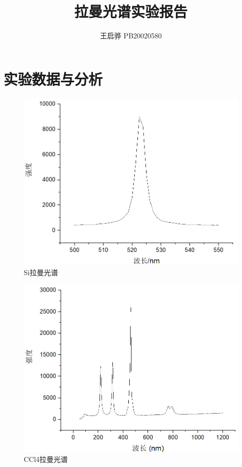 \documentclass{article}
\title{\songti \zihao{2}\bfseries 拉曼光谱实验报告}
\author{王启骅 PB20020580}
\begin{document}
	\maketitle
	\section{实验数据与分析}
	 \begin{figure}[!h]
		\centering
		\includegraphics[scale=0.8]{Si}
		\caption{\heiti{}Si拉曼光谱}
		
	\end{figure}

	 \begin{figure}[!h]
		\centering
		\includegraphics[scale=0.8]{CCl4}
		\caption{\heiti{}CCl4拉曼光谱}
		
	\end{figure}
\end{document}
